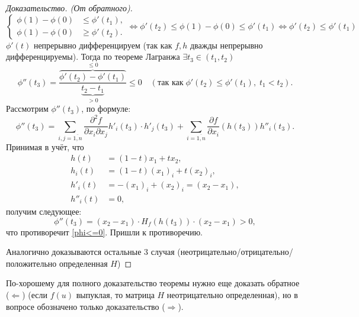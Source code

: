\begin{theorem}
\begin{proof}[Доказательство. (От обратного)]
\begin{equation*}
			\begin{cases}
				\phi(1)-\phi(0) &\leq \phi'(t_1),\\
				\phi(1)-\phi(0) &\geq \phi'(t_2).
			\end{cases}
			\Leftrightarrow
			\phi'(t_2)\leq\phi(1)-\phi(0)\leq\phi'(t_1)
			\Leftrightarrow
			\phi'(t_2)\leq\phi'(t_1)
		\end{equation*}
		$\phi'(t)$ непрерывно дифференцируем (так как $f,h$ дважды непрерывно дифференцируемы). Тогда по теореме Лагранжа $\exists t_3\in (t_1, t_2)$
		\begin{equation}\label{phi<=0}
			\phi''(t_3) = \frac{\overbrace{\phi'(t_2)-\phi'(t_1)}^{\leq0}}{\underbrace{t_2-t_1}_{>0}}\leq 0\quad (\text{так как}\; \phi'(t_2)\leq\phi'(t_1),\;t_1<t_2).
		\end{equation}
		Рассмотрим $\phi''(t_3)$, по формуле:
		\begin{equation*}
			\phi''(t_3)=\sum_{i,j=\overline{1,n}} \frac{\partial^2f}{\partial x_i\partial x_j} h'_i(t_3)\cdot h'_j(t_3) + \sum_{i=\overline{1,n}} \frac{\partial f}{\partial x_i}\left(h(t_3)\right)h''_i(t_3).
		\end{equation*}
		Принимая в учёт, что
		\begin{align*}
			h(t) &= (1-t)x_1 + tx_2,\\
			h_i(t) &= (1-t)(x_1)_i + t(x_2)_i,\\
			h'_i(t) &= -(x_1)_i + (x_2)_i = (x_2-x_1),\\
			h''_i(t) &= 0,
		\end{align*}
		получим следующее:
		\begin{equation*}
			\phi''(t_3) = (x_2-x_1) \cdot H_f\left(h(t_3)\right) \cdot (x_2-x_1)>0,
		\end{equation*}
		что противоречит \eqref{phi<=0}. Пришли к противоречию.
		
		Аналогично доказываются остальные 3 случая (неотрицательно/отрицательно/положительно определенная $H$)
	\end{proof}
	\begin{remark}
		По-хорошему для полного доказательство теоремы нужно еще доказать обратное ($\Leftarrow$) (если $f(u)$ выпуклая, то матрица $H$ неотрицательно определенная), но в вопросе обозначено только доказательство ($\Rightarrow$).
	\end{remark}
\end{theorem}